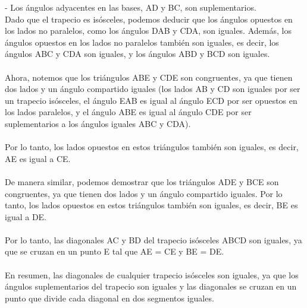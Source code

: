 \documentclass{article}
\begin{document}
- Los ángulos adyacentes en las bases, AD y BC, son suplementarios.\\
Dado que el trapecio es isósceles, podemos deducir que los ángulos opuestos en los lados no paralelos, como los ángulos DAB y CDA, son iguales. Además, los ángulos opuestos en los lados no paralelos también son iguales, es decir, los ángulos ABC y CDA son iguales, y los ángulos ABD y BCD son iguales.\\
\\
Ahora, notemos que los triángulos ABE y CDE son congruentes, ya que tienen dos lados y un ángulo compartido iguales (los lados AB y CD son iguales por ser un trapecio isósceles, el ángulo EAB es igual al ángulo ECD por ser opuestos en los lados paralelos, y el ángulo ABE es igual al ángulo CDE por ser suplementarios a los ángulos iguales ABC y CDA).\\
\\
Por lo tanto, los lados opuestos en estos triángulos también son iguales, es decir, AE es igual a CE.\\
\\
De manera similar, podemos demostrar que los triángulos ADE y BCE son congruentes, ya que tienen dos lados y un ángulo compartido iguales. Por lo tanto, los lados opuestos en estos triángulos también son iguales, es decir, BE es igual a DE.\\
\\
Por lo tanto, las diagonales AC y BD del trapecio isósceles ABCD son iguales, ya que se cruzan en un punto E tal que AE = CE y BE = DE.\\
\\
En resumen, las diagonales de cualquier trapecio isósceles son iguales, ya que los ángulos suplementarios del trapecio son iguales y las diagonales se cruzan en un punto que divide cada diagonal en dos segmentos iguales.\\
\\
\\
\end{document}
